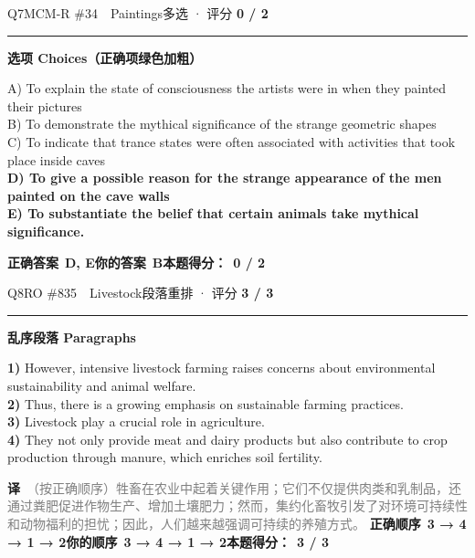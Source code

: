 \documentclass[11pt]{article}
\newcommand{\ptesub}[1]{%
  \par\needspace{2\baselineskip}\smallskip
  {\color{cAccent}\rule[-0.2ex]{3pt}{1.05em}}\hspace{6pt}%
  {\bfseries\color{cHead}#1}\par\nopagebreak\smallskip}
\newcommand{\zh}[1]{{\footnotesize\textcolor{cNote}{\textbf{译}}\ \textcolor{gray}{#1}}}
\begin{document}
\begin{qblock}{Q7\quad MCM-R \#34\ \ Paintings}{多选 · 评分 \textcolor{cAccent}{\bfseries 0 / 2}}
\ptesub{选项 Choices（正确项绿色加粗）}
{\small
A) To explain the state of consciousness the artists were in when they painted their pictures\\
B) To demonstrate the mythical significance of the strange geometric shapes\\
C) To indicate that trance states were often associated with activities that took place inside caves\\
{\color{cFix}\textbf{D) To give a possible reason for the strange appearance of the men painted on the cave walls}}\\
{\color{cFix}\textbf{E) To substantiate the belief that certain animals take mythical significance.}}}
\par\smallskip
\textbf{正确答案}\ \textcolor{cFix}{\bfseries D, E}\qquad\textbf{你的答案}\ {\color{cWrong}\bfseries B}\qquad\textbf{本题得分：}\ {\color{cAccent}\bfseries 0 / 2}
\end{qblock}

\begin{qblock}{Q8\quad RO \#835\ \ Livestock}{段落重排 · 评分 \textcolor{cAccent}{\bfseries 3 / 3}}
\ptesub{乱序段落 Paragraphs}
\begin{promptbox}
\textbf{1)} However, intensive livestock farming raises concerns about environmental sustainability and animal welfare.\\
\textbf{2)} Thus, there is a growing emphasis on sustainable farming practices.\\
\textbf{3)} Livestock play a crucial role in agriculture.\\
\textbf{4)} They not only provide meat and dairy products but also contribute to crop production through manure, which enriches soil fertility.
\end{promptbox}
\zh{（按正确顺序）牲畜在农业中起着关键作用；它们不仅提供肉类和乳制品，还通过粪肥促进作物生产、增加土壤肥力；然而，集约化畜牧引发了对环境可持续性和动物福利的担忧；因此，人们越来越强调可持续的养殖方式。}
\smallskip
\textbf{正确顺序}\ \textcolor{cFix}{\bfseries 3 → 4 → 1 → 2}\qquad\textbf{你的顺序}\ \textcolor{cFix}{\bfseries 3 → 4 → 1 → 2}\qquad\textbf{本题得分：}\ {\color{cAccent}\bfseries 3 / 3}
\end{qblock}
\end{document}
